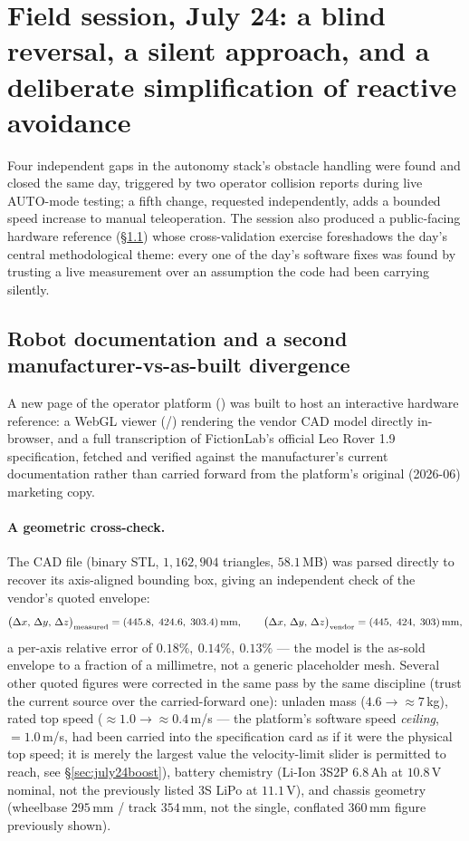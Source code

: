 \section{Field session, July 24: a blind reversal, a silent approach, and a
deliberate simplification of reactive avoidance}
\label{sec:july24}
Four independent gaps in the autonomy stack's obstacle handling were found
and closed the same day, triggered by two operator collision reports
during live AUTO-mode testing; a fifth change, requested independently,
adds a bounded speed increase to manual teleoperation. The session also
produced a public-facing hardware reference (\S\ref{sec:july24robot}) whose
cross-validation exercise foreshadows the day's central methodological
theme: every one of the day's software fixes was found by trusting a live
measurement over an assumption the code had been carrying silently.

\subsection{Robot documentation and a second manufacturer-vs-as-built
divergence}
\label{sec:july24robot}
A new page of the operator platform () was
built to host an interactive hardware reference: a WebGL viewer
(/) rendering the vendor CAD model
directly in-browser, and a full transcription of FictionLab's official Leo
Rover 1.9 specification, fetched and verified against the manufacturer's
current documentation rather than carried forward from the platform's
original (2026-06) marketing copy.

\paragraph{A geometric cross-check.} The CAD file (binary STL,
$1{,}162{,}904$ triangles, $58.1$\,MB) was parsed directly to recover its
axis-aligned bounding box, giving an independent check of the vendor's
quoted envelope:
\begin{equation}
\big(\Delta x,\, \Delta y,\, \Delta z\big)_{\text{measured}} =
(445.8,\; 424.6,\; 303.4)\text{\,mm}, \qquad
\big(\Delta x,\, \Delta y,\, \Delta z\big)_{\text{vendor}} =
(445,\; 424,\; 303)\text{\,mm},
\label{eq:stlbbox}
\end{equation}
a per-axis relative error of $0.18\%,\ 0.14\%,\ 0.13\%$ — the model is the
as-sold envelope to a fraction of a millimetre, not a generic
placeholder mesh. Several other quoted figures were corrected in the same
pass by the same discipline (trust the current source over the carried-forward
one): unladen mass ($4.6\to\approx7$\,kg), rated top speed
($\approx1.0\to\approx0.4$\,m/s — the platform's software speed
\emph{ceiling}, $=1.0$\,m/s, had been carried
into the specification card as if it were the physical top speed; it is
merely the largest value the velocity-limit slider is permitted to reach,
see \S\ref{sec:july24boost}), battery chemistry (Li-Ion 3S2P $6.8$\,Ah at
$10.8$\,V nominal, not the previously listed 3S LiPo at $11.1$\,V), and
chassis geometry (wheelbase $295$\,mm / track $354$\,mm, not the single,
conflated $360$\,mm figure previously shown).

